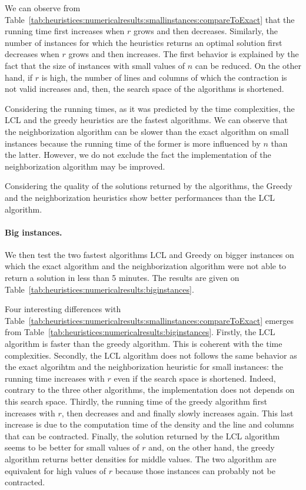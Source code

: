 We can observe from Table~\ref{tab:heuristices:numericalresults:smallinstances:compareToExact} that the running time first increases when $r$ grows and then decreases. Similarly, the number of instances for which the heuristics returns an optimal solution first decreases when $r$ grows and then increases. The first behavior is explained by the fact that the size of instances with small values of $n$ can be reduced. On the other hand, if $r$ is high, the number of lines and columns of which the contraction is not valid increases and, then, the search space of the algorithms is shortened.

Considering the running times, as it was predicted by the time complexities, the LCL and the greedy heuristics are the fastest algorithms. We can observe that the neighborization algorithm can be slower than the exact algorithm on small instances because the running time of the former is more influenced by $n$ than the latter. However, we do not exclude the fact the implementation of the neighborization algorithm may be improved.

Considering the quality of the solutions returned by the algorithms, the Greedy and the neighborization heuristics show better performances than the LCL algorithm.

\paragraph{Big instances. }
We then test the two fastest algorithms LCL and Greedy on bigger instances on which the exact algorithm and the neighborization algorithm were not able to return a solution in less than 5 minutes. The results are given on Table~\ref{tab:heuristices:numericalresults:biginstances}.

\begin{table}[ht!]
	\centering
	\def\arraystretch{1.2}
	\setlength\tabcolsep{0.05cm}
	\scriptsize
	
	\caption{}
	\label{tab:heuristices:numericalresults:biginstances}
\end{table}

Four interesting differences with Table~\ref{tab:heuristices:numericalresults:smallinstances:compareToExact} emerges from Table~\ref{tab:heuristices:numericalresults:biginstances}. Firstly, the LCL algorithm is faster than the greedy algorithm. This is coherent with the time complexities. Secondly, the LCL algorithm does not follows the same behavior as the exact algorihtm and the neighborization heuristic for small instances: the running time increases with $r$ even if the search space is shortened. Indeed, contrary to the three other algorithms, the implementation does not depends on this search space. Thirdly, the running time of the greedy algorithm first increases with $r$, then decreases and and finally slowly increases again. This last increase is due to the computation time of the density and the line and columns that can be contracted.  Finally, the solution returned by the LCL algorithm seems to be better for small values of $r$ and, on the other hand, the greedy algorithm returns better densities for middle values. The two algorithm are equivalent for high values of $r$ because those instances can probably not be contracted.